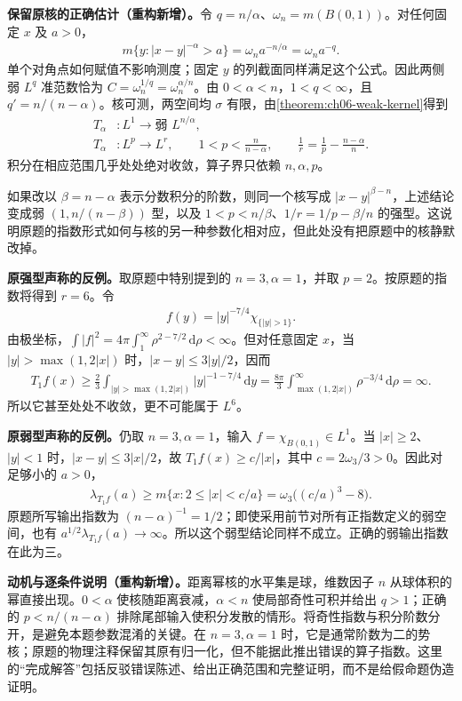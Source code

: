 \documentclass[../../main.tex]{subfiles}
\begin{document}
\begin{solution}
\textbf{保留原核的正确估计（重构新增）。}令 $q=n/\alpha$、$\omega_n=m(B(0,1))$。对任何固定 $x$ 及 $a>0$，
\begin{align*}
m\{y:|x-y|^{-\alpha}>a\}
=\omega_n a^{-n/\alpha}=\omega_n a^{-q}.
\end{align*}
单个对角点如何赋值不影响测度；固定 $y$ 的列截面同样满足这个公式。因此两侧弱 $L^q$ 准范数恰为 $C=\omega_n^{1/q}=\omega_n^{\alpha/n}$。由 $0<\alpha<n$，$1<q<\infty$，且 $q'=n/(n-\alpha)$。核可测，两空间均 $\sigma$ 有限，由\cref{theorem:ch06-weak-kernel}得到
\begin{align*}
T_\alpha &:L^1\longrightarrow \text{弱 }L^{n/\alpha},\\
T_\alpha &:L^p\longrightarrow L^r,\qquad
1<p<\frac n{n-\alpha},\qquad
\frac1r=\frac1p-\frac{n-\alpha}{n}.
\end{align*}
积分在相应范围几乎处处绝对收敛，算子界只依赖 $n,\alpha,p$。

如果改以 $\beta=n-\alpha$ 表示分数积分的阶数，则同一个核写成 $|x-y|^{\beta-n}$，上述结论变成弱 $(1,n/(n-\beta))$ 型，以及 $1<p<n/\beta$、$1/r=1/p-\beta/n$ 的强型。这说明原题的指数形式如何与核的另一种参数化相对应，但此处没有把原题中的核静默改掉。

\textbf{原强型声称的反例。}取原题中特别提到的 $n=3,\alpha=1$，并取 $p=2$。按原题的指数将得到 $r=6$。令
\begin{align*}
f(y)=|y|^{-7/4}\chi_{\{|y|>1\}}.
\end{align*}
由极坐标，$\int|f|^2=4\pi\int_1^\infty\rho^{2-7/2}\,\mathrm d\rho<\infty$。但对任意固定 $x$，当 $|y|>\max(1,2|x|)$ 时，$|x-y|\leqslant3|y|/2$，因而
\begin{align*}
T_1f(x)\geqslant\frac23\int_{|y|>\max(1,2|x|)}|y|^{-1-7/4}\,\mathrm dy
=\frac{8\pi}3\int_{\max(1,2|x|)}^\infty\rho^{-3/4}\,\mathrm d\rho=\infty.
\end{align*}
所以它甚至处处不收敛，更不可能属于 $L^6$。

\textbf{原弱型声称的反例。}仍取 $n=3,\alpha=1$，输入 $f=\chi_{B(0,1)}\in L^1$。当 $|x|\geqslant2$、$|y|<1$ 时，$|x-y|\leqslant3|x|/2$，故 $T_1f(x)\geqslant c/|x|$，其中 $c=2\omega_3/3>0$。因此对足够小的 $a>0$，
\begin{align*}
\lambda_{T_1f}(a)\geqslant
m\{x:2\leqslant|x|<c/a\}
=\omega_3\bigl((c/a)^3-8\bigr).
\end{align*}
原题所写输出指数为 $(n-\alpha)^{-1}=1/2$；即使采用前节对所有正指数定义的弱空间，也有 $a^{1/2}\lambda_{T_1f}(a)\to\infty$。所以这个弱型结论同样不成立。正确的弱输出指数在此为三。
\end{solution}
\begin{remark}
\textbf{动机与逐条件说明（重构新增）。}距离幂核的水平集是球，维数因子 $n$ 从球体积的幂直接出现。$0<\alpha$ 使核随距离衰减，$\alpha<n$ 使局部奇性可积并给出 $q>1$；正确的 $p<n/(n-\alpha)$ 排除尾部输入使积分发散的情形。将奇性指数与积分阶数分开，是避免本题参数混淆的关键。在 $n=3,\alpha=1$ 时，它是通常阶数为二的势核；原题的物理注释保留其原有归一化，但不能据此推出错误的算子指数。这里的“完成解答”包括反驳错误陈述、给出正确范围和完整证明，而不是给假命题伪造证明。
\end{remark}
\end{document}
